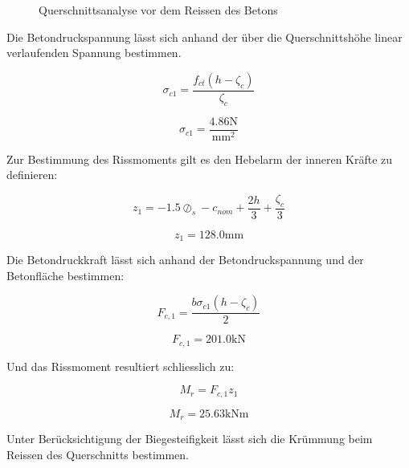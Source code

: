 \documentclass[
  12pt,
  letterpaper,
  egregdoesnotlikesansseriftitles]{scrreprt}
\begin{document}
\begin{figure}[H]


\caption{\label{fig-qs2}Querschnittsanalyse vor dem Reissen des Betons}

\end{figure}%

Die Betondruckspannung lässt sich anhand der über die Querschnittshöhe
linear verlaufenden Spannung bestimmen.

\begin{equation}\sigma_{c 1} = \frac{f_{ct} \left(h - \zeta_{c}\right)}{\zeta_{c}}\end{equation}

\begin{equation}\sigma_{c 1} = \frac{4.86 \text{N}}{\text{mm}^{2}}\end{equation}

Zur Bestimmung des Rissmoments gilt es den Hebelarm der inneren Kräfte
zu definieren:

\begin{equation}z_{1} = - 1.5 \oslash_{s} - c_{nom} + \frac{2 h}{3} + \frac{\zeta_{c}}{3}\end{equation}

\begin{equation}z_{1} = 128.0 \text{mm}\end{equation}

Die Betondruckkraft lässt sich anhand der Betondruckspannung und der
Betonfläche bestimmen:

\begin{equation}F_{c,1} = \frac{b \sigma_{c 1} \left(h - \zeta_{c}\right)}{2}\end{equation}

\begin{equation}F_{c,1} = 201.0 \text{kN}\end{equation}

Und das Rissmoment resultiert schliesslich zu:

\begin{equation}M_{r} = F_{c,1} z_{1}\end{equation}

\begin{equation}M_{r} = 25.63 \text{kN} \text{m}\end{equation}

Unter Berücksichtigung der Biegesteifigkeit lässt sich die Krümmung beim
Reissen des Querschnitts bestimmen.
\end{document}
